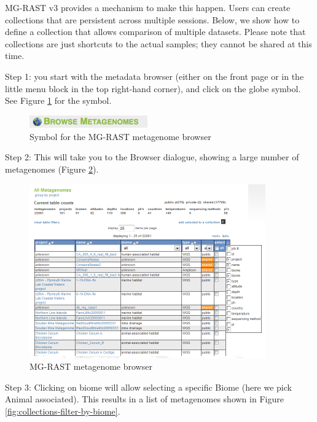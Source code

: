 \documentclass[12pt,fullpage]{report}
\begin{document}
MG-RAST v3 provides a mechanism to make this happen. Users can create collections that are persistent across multiple sessions.
Below, we show how to define a collection that allows comparison of multiple datasets. Please note that collections are just shortcuts to the actual samples; they cannot be shared at this time.

Step 1: you start with the metadata browser (either on the front page or in the little menu block in the top right-hand corner), and click on the globe symbol. See Figure \ref{fig:browse-for-metagenomes} for the symbol.

\begin{figure}[ht]
\begin{center}
\includegraphics[width=2in]{Images/browse-for-metagenomes.png}
\end{center}
\caption{
Symbol for the MG-RAST metagenome browser}
\label{fig:browse-for-metagenomes}
\end{figure}

Step 2: This will take you to the Browser dialogue, showing a large number of metagenomes (Figure \ref{fig:browse-window}).

\begin{figure}
\begin{center}
\includegraphics[width=4in]{Images/collections-browse-window.png}
\end{center}
\caption{
MG-RAST metagenome browser}
\label{fig:browse-window}
\end{figure}

Step 3: Clicking on biome will allow selecting a specific Biome (here we pick Animal associated).
This results in a list of metagenomes shown in 
Figure \ref{fig:collections-filter-by-biome}.
\end{document}
